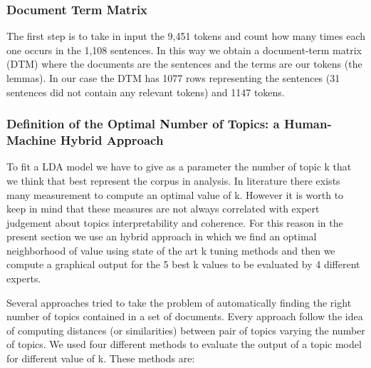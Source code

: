 \documentclass[b5paper,]{book}
\theoremstyle{definition}
\theoremstyle{definition}
\theoremstyle{definition}
\theoremstyle{remark}
\begin{document}
\subsubsection*{Document Term Matrix}\label{document-term-matrix}

The first step is to take in input the 9,451 tokens and count how many
times each one occurs in the 1,108 sentences. In this way we obtain a
document-term matrix (DTM) where the documents are the sentences and the
terms are our tokens (the lemmas). In our case the DTM has 1077 rows
representing the sentences (31 sentences did not contain any relevant
tokens) and 1147 tokens.

\subsubsection*{Definition of the Optimal Number of Topics: a
Human-Machine Hybrid
Approach}\label{definition-of-the-optimal-number-of-topics-a-human-machine-hybrid-approach}

To fit a LDA model we have to give as a parameter the number of topic k
that we think that best represent the corpus in analysis. In literature
there exists many measurement to compute an optimal value of k. However
it is worth to keep in mind that these measures are not always
correlated with expert judgement about topics interpretability and
coherence. For this reason in the present section we use an hybrid
approach in which we find an optimal neighborhood of value using state
of the art k tuning methods and then we compute a graphical output for
the 5 best k values to be evaluated by 4 different experts.

Several approaches tried to take the problem of automatically finding
the right number of topics contained in a set of documents. Every
approach follow the idea of computing distances (or similarities)
between pair of topics varying the number of topics. We used four
different methods to evaluate the output of a topic model for different
value of k. These methods are:
\end{document}
